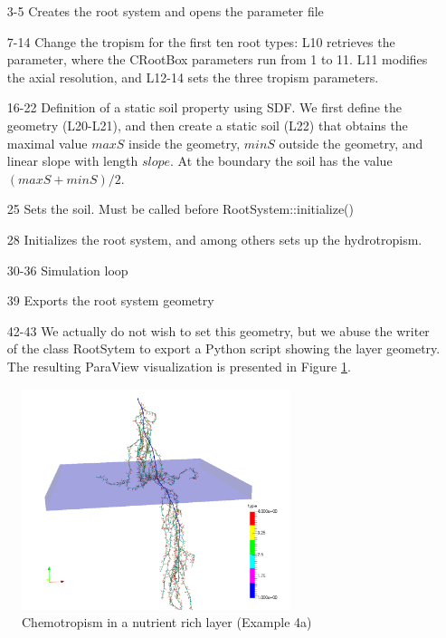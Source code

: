\documentclass[a4paper]{article}
\begin{document}
\begin{itemize}

\item[3-5] Creates the root system and opens the parameter file

\item[7-14] Change the tropism for the first ten root types: L10 retrieves the parameter, where the CRootBox parameters run from 1 to 11. L11 modifies the axial resolution, and L12-14 sets the three tropism parameters. 

\item[16-22] Definition of a static soil property using SDF. We first define the geometry (L20-L21), and then create a static soil (L22) that obtains the maximal value $maxS$ inside the geometry, 
$minS$ outside the geometry, and linear slope with length $slope$. At the boundary the soil has the value $(maxS+minS)/2$.

\item[25] Sets the soil. Must be called before RootSystem::initialize()

\item[28] Initializes the root system, and among others sets up the hydrotropism. 

\item[30-36] Simulation loop

\item[39] Exports the root system geometry

\item[42-43] We actually do not wish to set this geometry, but we abuse the writer of the class RootSytem to export a Python script showing the layer geometry. The resulting ParaView visualization is presented in Figure \ref{fig:chemo}.

\end{itemize}

\begin{figure}
\centering
\includegraphics[width=0.7\textwidth]{example4a.png}
\caption{Chemotropism in a nutrient rich layer (Example 4a)} \label{fig:chemo}
\end{figure}
\end{document}

